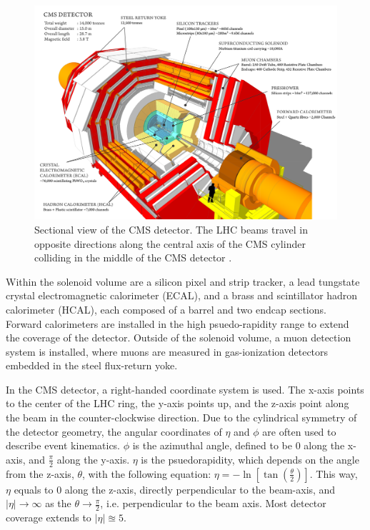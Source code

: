 \begin{figure}
    \begin{minipage}[t]{\linewidth}\centering
        \includegraphics[width=15cm]{cms_detector.png}
    \end{minipage}
    \caption{Sectional view of the CMS detector. The LHC beams travel in opposite directions 
    along the central axis of the CMS cylinder colliding in the middle of the CMS detector \cite{detector:cms_overall}.}
    \label{fig:cms_overall_diagram}
\end{figure}

Within the solenoid volume are a silicon pixel and strip tracker, a lead tungstate crystal electromagnetic calorimeter (ECAL), 
and a brass and scintillator hadron calorimeter (HCAL), each composed of a barrel and two endcap sections. Forward calorimeters
are installed in the high psuedo-rapidity range to extend the coverage of the detector. Outside of the solenoid volume,
a muon detection system is installed, where muons are measured in gas-ionization detectors embedded in the steel flux-return yoke.

In the CMS detector, a right-handed coordinate system is used. The x-axis points to the center of the LHC ring, the y-axis points up, 
and the z-axis point along the beam in the counter-clockwise direction. Due to the cylindrical symmetry of the detector geometry, the angular
coordinates of $\eta$ and $\phi$ are often used to describe event kinematics. $\phi$ is the azimuthal angle, defined to be 0 along the x-axis,
and $\frac{\pi}{2}$ along the y-axis. $\eta$ is the psuedorapidity, which depends on the angle from the z-axis, $\theta$, with the following
equation: $\eta = -\ln[{\tan({\frac{\theta}{2}})}]$. This way, $\eta$ equals to 0 along the z-axis, directly perpendicular to the beam-axis,
and $|\eta| \rightarrow \infty$ as the $\theta \rightarrow \frac{\pi}{2}$, i.e. perpendicular to the beam axis. Most detector coverage
extends to $|\eta| \approxeq 5$. 

